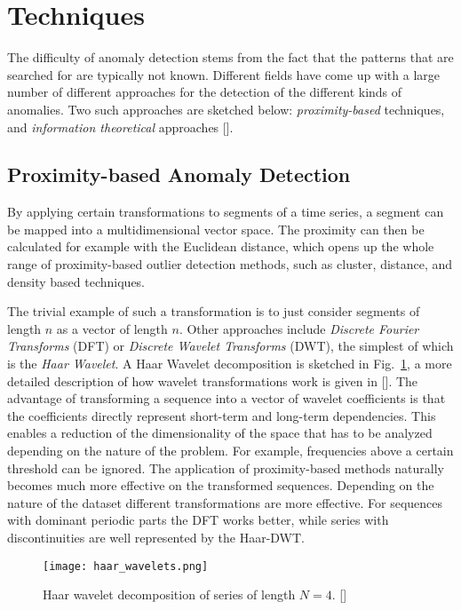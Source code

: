 \newpage
\section{Techniques}
\label{sec:techniques}

The difficulty of anomaly detection stems from the fact that the patterns that
are searched for are typically not known.  Different fields have come up with a
large number of different approaches for the detection of the different kinds
of anomalies. Two such approaches  are sketched below: \emph{proximity-based}
techniques, and {\em information theoretical} approaches [\cite{AggarwalCharuC2017}].

\subsection{Proximity-based Anomaly Detection}
\label{sub:proximity_based_anomaly_detection}

By applying certain transformations to segments of a time series, a segment can be
mapped into a multidimensional vector space. The proximity can then be
calculated for example with the Euclidean distance, which opens up the whole
range of proximity-based outlier detection methods, such as cluster, distance,
and density based techniques.

The trivial example of such a transformation is to just consider segments of
length $n$ as a vector of length $n$.  Other approaches include \emph{Discrete
Fourier Transforms} (DFT) or \emph{Discrete Wavelet Transforms} (DWT), the
simplest of which is the \emph{Haar Wavelet}. A Haar Wavelet decomposition is
sketched in Fig.~\ref{fig:haar_wavelets}, a more detailed description of how
wavelet transformations work is given in [\cite{AggarwalCharuC2017}]. The
advantage of transforming a sequence into a vector of wavelet coefficients is
that the coefficients directly represent short-term and long-term dependencies.
This enables a reduction of the dimensionality of the space that has to be
analyzed depending on the nature of the problem. For example, frequencies above
a certain threshold can be ignored.  The application of proximity-based methods
naturally becomes much more effective on the transformed sequences. Depending
on the nature of the dataset different transformations are more effective.  For
sequences with dominant periodic parts the DFT works better, while series with
discontinuities are well represented by the Haar-DWT.

\begin{figure}
  \centering
  \texttt{[image: haar\_wavelets.png]}
  \caption{Haar wavelet decomposition of series of length $N=4$.
  [\cite{AggarwalCharuC2017}]}
  \label{fig:haar_wavelets}
\end{figure}


